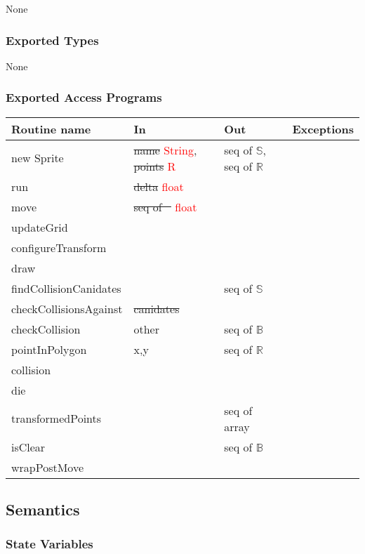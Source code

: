 \documentclass[12pt]{article}
\begin{document}
None

\subsubsection* {Exported Types}

None 

\subsubsection* {Exported Access Programs}

\begin{tabular}{| l | l | l | p{5cm} |}
\hline
\textbf{Routine name} & \textbf{In} & \textbf{Out} & \textbf{Exceptions}\\
\hline
new Sprite & \sout{name} \textcolor{red}{String}, \sout{points} \textcolor{red}{R}  & seq of $\mathbb{S}$, seq of $\mathbb{R}$ & ~\\
\hline
run & \sout{delta} \textcolor{red}{float} & ~ & ~\\
\hline
move & \sout{seq of ~} \textcolor{red}{float} & ~ & ~\\
\hline
updateGrid & ~ & ~ & ~\\
\hline
configureTransform & ~ & ~ & ~\\
\hline
draw & ~ & ~ & ~ \\
\hline
findCollisionCanidates & ~ & seq of $\mathbb{S}$ & ~\\
\hline
checkCollisionsAgainst & \sout{canidates} & ~ & ~\\
\hline
checkCollision & other & seq of $\mathbb{B}$ & ~\\
\hline
pointInPolygon & x,y & seq of $\mathbb{R}$ & ~ \\
\hline
collision & ~ & ~ & ~ \\
\hline
die & ~ & ~ & ~ \\
\hline
transformedPoints & ~ & seq of array & ~ \\
\hline
isClear & ~ & seq of $\mathbb{B}$ & ~ \\
\hline
wrapPostMove & ~ & ~ & ~ \\
\hline


\end{tabular}
\subsection* {Semantics}

\subsubsection* {State Variables}
\end{document}
